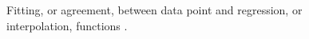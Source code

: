 \begin{figure}[htbp]
  \quad
  \caption[Fitting.]{Fitting, or agreement, between data point and
  regression, or interpolation, functions
  \cite{RefWorks:158}.}
  \label{fig:108fitting}
\end{figure}